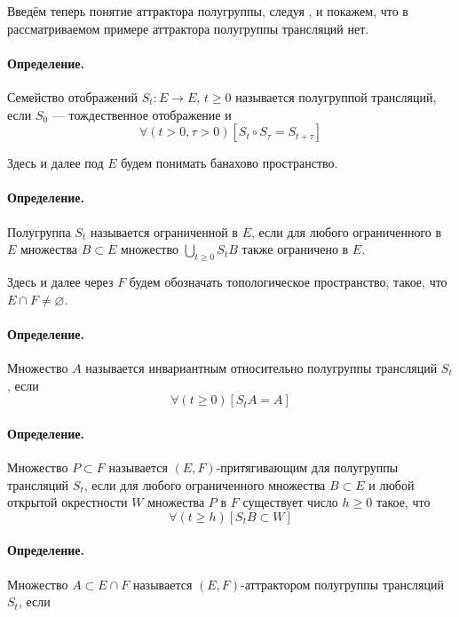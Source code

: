 Введём теперь понятие аттрактора полугруппы, следуя \cite[\S 4.1.1]{Vorotnikov},
и покажем, что в рассматриваемом примере аттрактора полугруппы трансляций нет.

\paragraph{Определение.}

Семейство отображений $S_t : E \to E$, $t \geq 0$ называется полугруппой трансляций,
если $S_0$ --- тождественное отображение и
$$
	\forall(t>0,\tau>0)[S_t \circ S_\tau = S_{t+\tau}]
$$

Здесь и далее под $E$ будем понимать банахово пространство.

\paragraph{Определение.}

Полугруппа $S_t$ называется ограниченной в $E$, если для любого ограниченного в $E$ множества $B \subset E$ множество $\bigcup\limits_{t\geq0}S_t B$ также ограничено в $E$.

Здесь и далее через $F$ будем обозначать топологическое пространство, такое, что $E \cap F \ne \varnothing$.

\paragraph{Определение.}

Множество $A$ называется инвариантным относительно полугруппы трансляций $S_t$, если
$$
	\forall(t\geq 0)[S_t A = A]
$$

\paragraph{Определение.}

Множество $P \subset F$ называется $(E,F)$-притягивающим для полугруппы трансляций $S_t$,
если для любого ограниченного множества $B \subset E$ и любой открытой окрестности $W$ множества $P$ в $F$ существует число $h\geq 0$ такое, что
$$
	\forall(t \geq h)[S_t B \subset W]
$$


\paragraph{Определение.}

Множество $A\subset E\cap F$ называется $(E,F)$-аттрактором полугруппы трансляций $S_t$, если

